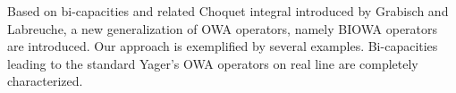 
Based on bi-capacities and related Choquet integral introduced by Grabisch and Labreuche, a new generalization of OWA operators, namely BIOWA operators are introduced. Our approach is exemplified by several examples. Bi-capacities leading to the standard Yager's OWA operators on real line are completely characterized.
\\

